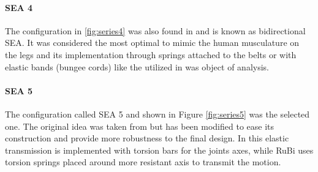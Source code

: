 \paragraph{SEA 4} %
\label{par:sea_4}
The configuration in \ref{fig:series4} was also found in \cite{biobiped} and is known as bidirectional SEA.
It was considered the most optimal to mimic the human musculature on the legs and its implementation through springs attached to the belts or with elastic bands (bungee cords) like the utilized in \cite{imperial_college} was object of analysis.

\paragraph{SEA 5} %
\label{par:sea_5}
The configuration called SEA 5 and shown in Figure \ref{fig:series5} was the selected one.
The original idea was taken from \cite{phides} but has been modified to ease its construction and provide more robustness to the final design.
In \cite{phides} this elastic transmission is implemented with torsion bars for the joints axes, while RuBi uses torsion springs placed around more resistant axis to transmit the motion.

